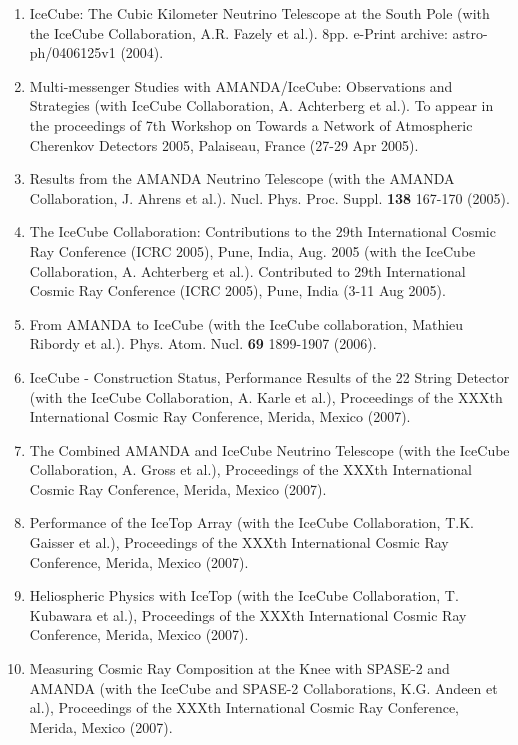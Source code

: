 \begin{enumerate}
\item IceCube: The Cubic Kilometer Neutrino Telescope at the South Pole (with the IceCube Collaboration, A.R. Fazely et al.).  8pp.  e-Print archive: astro-ph/0406125v1 (2004).

\item Multi-messenger Studies with AMANDA/IceCube: Observations and Strategies (with IceCube Collaboration, A. Achterberg et al.).  To appear in the proceedings of 7th Workshop on Towards a Network of Atmospheric Cherenkov Detectors 2005, Palaiseau, France (27-29 Apr 2005).

\item Results from the AMANDA Neutrino Telescope (with the AMANDA Collaboration, J. Ahrens et al.).  Nucl. Phys. Proc. Suppl. {\bf 138} 167-170 (2005).

\item The IceCube Collaboration: Contributions to the 29th International Cosmic Ray Conference (ICRC 2005), Pune, India, Aug. 2005 (with the IceCube Collaboration, A. Achterberg et al.).   Contributed to 29th International Cosmic Ray Conference (ICRC 2005), Pune, India (3-11 Aug 2005).

\item From AMANDA to IceCube (with the IceCube collaboration, Mathieu Ribordy et al.).  Phys. Atom. Nucl. {\bf 69} 1899-1907 (2006).

\item IceCube - Construction Status, Performance Results of the 22 String Detector (with the IceCube Collaboration, A. Karle et al.), Proceedings of the XXXth International Cosmic Ray Conference, Merida, Mexico (2007).

\item The Combined AMANDA and IceCube Neutrino Telescope (with the IceCube Collaboration, A. Gross et al.), Proceedings of the XXXth International Cosmic Ray Conference, Merida, Mexico (2007).

\item Performance of the IceTop Array (with the IceCube Collaboration, T.K. Gaisser et al.), Proceedings of the XXXth International Cosmic Ray Conference, Merida, Mexico (2007).

\item Heliospheric Physics with IceTop (with the IceCube Collaboration, T. Kubawara et al.), Proceedings of the XXXth International Cosmic Ray Conference, Merida, Mexico (2007).

\item Measuring Cosmic Ray Composition at the Knee with SPASE-2 and AMANDA (with the IceCube and SPASE-2 Collaborations, K.G. Andeen et al.), Proceedings of the XXXth International Cosmic Ray Conference, Merida, Mexico (2007).


\end{enumerate}
